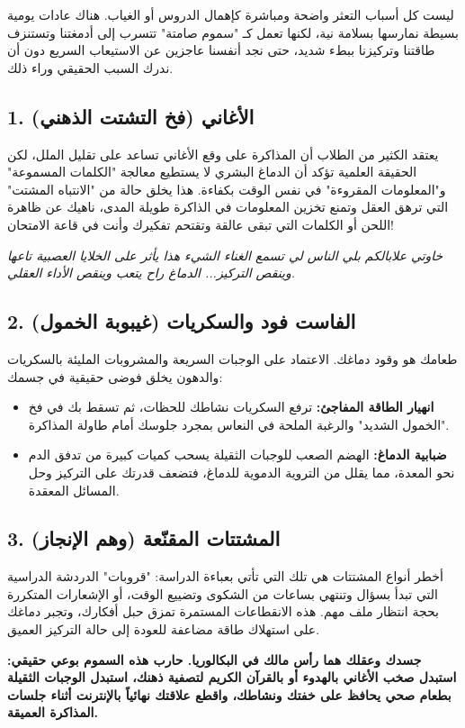 \documentclass[12pt,a4paper]{book}
\newcommand{\quoteAr}[1]{%
	\begin{myquote}
		\itshape #1
	\end{myquote}
}
\newcommand{\importantAr}[1]{%
	\begin{important}
		\bfseries #1
	\end{important}
}
\begin{document}
	ليست كل أسباب التعثر واضحة ومباشرة كإهمال الدروس أو الغياب. هناك عادات يومية بسيطة نمارسها بسلامة نية، لكنها تعمل كـ "سموم صامتة" تتسرب إلى أدمغتنا وتستنزف طاقتنا وتركيزنا ببطء شديد، حتى نجد أنفسنا عاجزين عن الاستيعاب السريع دون أن ندرك السبب الحقيقي وراء ذلك.
	
	\subsection{1. الأغاني (فخ التشتت الذهني)}
	يعتقد الكثير من الطلاب أن المذاكرة على وقع الأغاني تساعد على تقليل الملل، لكن الحقيقة العلمية تؤكد أن الدماغ البشري لا يستطيع معالجة "الكلمات المسموعة" و"المعلومات المقروءة" في نفس الوقت بكفاءة. هذا يخلق حالة من "الانتباه المشتت" التي ترهق العقل وتمنع تخزين المعلومات في الذاكرة طويلة المدى، ناهيك عن ظاهرة اللحن أو الكلمات التي تبقى عالقة وتقتحم تفكيرك وأنت في قاعة الامتحان!
	
	\quoteAr{خاوتي علابالكم بلي الناس لي تسمع الغناء الشيء هذا يأثر على الخلايا العصبية تاعها وينقص التركيز... الدماغ راح يتعب وينقص الأداء العقلي.}
	
	\subsection{2. الفاست فود والسكريات (غيبوبة الخمول)}
	طعامك هو وقود دماغك. الاعتماد على الوجبات السريعة والمشروبات المليئة بالسكريات والدهون يخلق فوضى حقيقية في جسمك:
	\begin{itemize}
		\item \textbf{انهيار الطاقة المفاجئ:} ترفع السكريات نشاطك للحظات، ثم تسقط بك في فخ "الخمول الشديد" والرغبة الملحة في النعاس بمجرد جلوسك أمام طاولة المذاكرة.
		\item \textbf{ضبابية الدماغ:} الهضم الصعب للوجبات الثقيلة يسحب كميات كبيرة من تدفق الدم نحو المعدة، مما يقلل من التروية الدموية للدماغ، فتضعف قدرتك على التركيز وحل المسائل المعقدة.
	\end{itemize}
	
	\subsection{3. المشتتات المقنّعة (وهم الإنجاز)}
	أخطر أنواع المشتتات هي تلك التي تأتي بعباءة الدراسة: "قروبات" الدردشة الدراسية التي تبدأ بسؤال وتنتهي بساعات من الشكوى وتضييع الوقت، أو الإشعارات المتكررة بحجة انتظار ملف مهم. هذه الانقطاعات المستمرة تمزق حبل أفكارك، وتجبر دماغك على استهلاك طاقة مضاعفة للعودة إلى حالة التركيز العميق.
	
	\importantAr{جسدك وعقلك هما رأس مالك في البكالوريا. حارب هذه السموم بوعي حقيقي: استبدل صخب الأغاني بالهدوء أو بالقرآن الكريم لتصفية ذهنك، استبدل الوجبات الثقيلة بطعام صحي يحافظ على خفتك ونشاطك، واقطع علاقتك نهائياً بالإنترنت أثناء جلسات المذاكرة العميقة.}
	
\end{document}
